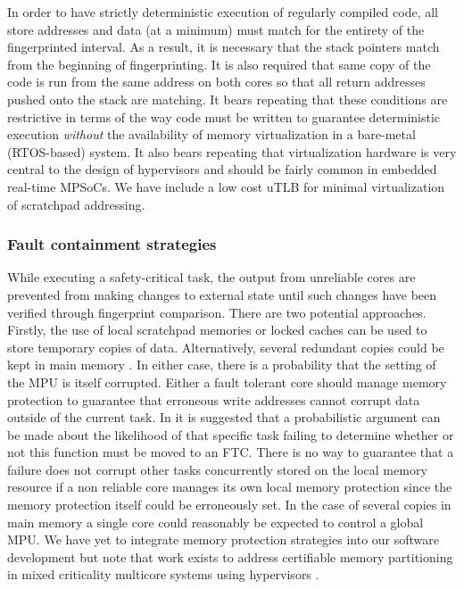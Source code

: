 In order to have strictly deterministic execution of regularly compiled code, all store addresses and data (at a minimum) must match for the entirety of the fingerprinted interval. As a result, it is necessary that the stack pointers match from the beginning of fingerprinting. It is also required that same copy of the code is run from the same address on both cores so that all return addresses pushed onto the stack are matching. It bears repeating that these conditions are restrictive in terms of the way code must be written to guarantee deterministic execution \emph{without} the availability of memory virtualization in a bare-metal (RTOS-based) system. It also bears repeating that virtualization hardware is very central to the design of hypervisors and should be fairly common in embedded real-time MPSoCs. We have include a low cost uTLB for minimal virtualization of scratchpad addressing.

\subsubsection{Fault containment strategies}
	While executing a safety-critical task, the output from unreliable cores are prevented from making changes to external state until such changes have been verified through fingerprint comparison. 
	There are two potential approaches. Firstly, the use of local scratchpad memories or locked caches can be used to store temporary copies of data. 
	Alternatively, several redundant copies could be kept in main memory \cite{dobel2012operating}. 
	In either case, there is a probability that the setting of the MPU is itself corrupted. Either a fault tolerant core should manage memory protection to guarantee that erroneous write addresses cannot corrupt data outside of the current task. In \cite{huang2014framework} it is suggested that a probabilistic argument can be made about the likelihood of that specific task failing to determine whether or not this function must be moved to an FTC. 
	There is no way to guarantee that a failure does not corrupt other tasks concurrently stored on the local memory resource if a non reliable core manages its own local memory protection since the memory protection itself could be erroneously set. 
	In the case of several copies in main memory a single core could reasonably be expected to control a global MPU. 
	We have yet to integrate memory protection strategies into our software development but note that work exists to address certifiable memory partitioning in mixed criticality multicore systems using hypervisors \cite{perez2013safety}.
	
